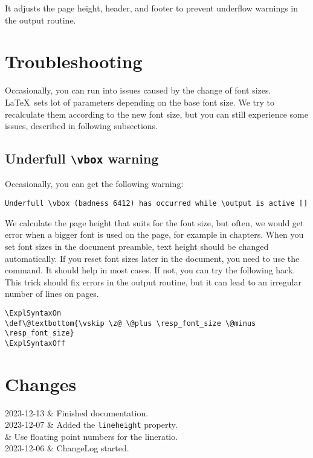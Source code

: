 \documentclass{ltxdoc}
\makeatletter
\newenvironment{changelog}{\longtable{@{} l p{30em}}}{\endlongtable}
\newcommand\change[2]{#1 & #2\\}
\makeatother
\begin{document}
\noindent It adjusts the page height, header, and footer to prevent underflow
\cmd{\vbox} warnings in the output routine.



\section{Troubleshooting}

Occasionally, you can run into issues caused by the change of font sizes. \LaTeX\ sets lot of parameters 
depending on the base font size. We try to recalculate them according to the new font size, but you can still
experience some issues, described in following subsections.

\subsection{Underfull \texttt{\textbackslash vbox} warning}

Occasionally, you can get the following warning:

\begin{verbatim}
Underfull \vbox (badness 6412) has occurred while \output is active []
\end{verbatim}

We calculate the page height that suits  for the font size, but often,
we would get error when a bigger font is used on the page,
for example in chapters. When you set font sizes in the document preamble,
text height should be changed automatically. If you reset font sizes later in the
document, you need to use the \cmd{\fixtextheight} command. It should help in
most cases. If not, you can try the following hack.
This trick should fix \cmd{\vbox} errors in the output routine, but it can lead 
to an irregular number of lines on pages.


\begin{verbatim}
\ExplSyntaxOn
\def\@textbottom{\vskip \z@ \@plus \resp_font_size \@minus \resp_font_size}
\ExplSyntaxOff
\end{verbatim}

\section{Changes}

\begin{changelog}
  \change{2023-12-13}{Finished documentation.}
  \change{2023-12-07}{Added the \texttt{lineheight} property.}
  \change{}{Use floating point numbers for the lineratio.}
  \change{2023-12-06}{ChangeLog started.}
\end{changelog}

\printbibliography[heading=bibintoc]
\end{document}
